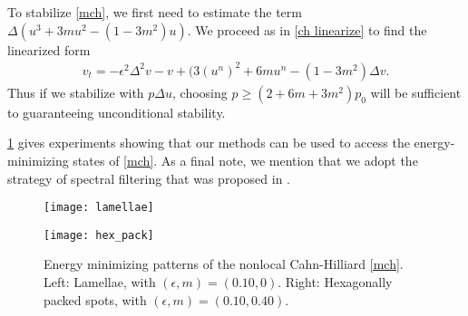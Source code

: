 To stabilize \cref{mch}, we first need to estimate the term $\Delta(u^3 + 3mu^2-(1-3m^2)u)$. We proceed as in \cref{ch linearize} to find the linearized form
\begin{align}
v_t = -\epsilon^2\Delta^2 v - v + (3(u^n)^2 + 6mu^n - (1-3m^2) \Delta v.
\end{align}
Thus if we stabilize with $p\Delta u$, choosing $p \geq (2+6m+3m^2)p_0$ will be sufficient to guaranteeing unconditional stability.

\cref{fig:mchp energy minimizers} gives experiments showing that our methods can be used to access the energy-minimizing states of \cref{mch}. As a final note, we mention that we adopt the strategy of spectral filtering that was proposed in \cite{choksi20112d}.

\begin{figure}[htb!]
        \centering
\begin{minipage}{0.46\textwidth}
       \texttt{[image: lamellae]}
\end{minipage}
\begin{minipage}{0.46\textwidth}
\centering
       \texttt{[image: hex\_pack]}
\end{minipage}
\caption[{Energy minimizing patterns of the nonlocal Cahn-Hilliard.}]{Energy minimizing patterns of the nonlocal Cahn-Hilliard \cref{mch}. Left: Lamellae, with $(\epsilon,m)=(0.10,0)$. Right: Hexagonally packed spots, with $(\epsilon,m)=(0.10,0.40)$.}
\label{fig:mchp energy minimizers}
\end{figure}
